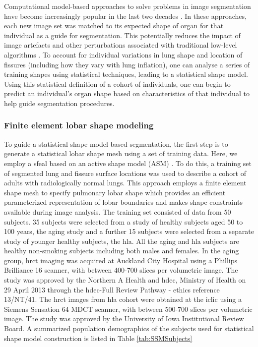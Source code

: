 Computational model-based approaches to solve problems in image segmentation have become increasingly popular in the last two decades \citep{taylor1995medical,kelemen1999elastic,tsai2003shape,okada2008automated}. In these approaches, each new image set was matched to its expected shape of organ for that individual as a guide for segmentation. This potentially reduces the impact of image artefacts and other perturbations associated with traditional low-level algorithms \citep{ecabert2008automatic,zhang2013development}. To account for individual variations in lung shape and location of fissures (including how they vary with lung inflation), one can analyse a series of training shapes using statistical techniques, leading to a statistical shape model. Using this statistical definition of a cohort of individuals, one can begin to predict an individual's organ shape based on characteristics of that individual to help guide segmentation procedures.

\subsubsection{Finite element lobar shape modeling} 

To guide a statistical shape model based segmentation, the first step is to generate a statistical lobar shape mesh using a set of training data. Here, we employ a \gls{sfeal} based on an active shape model (ASM) \citep{cootes1995active}. To do this, a training set of segmented lung and fissure surface locations was used to describe a cohort of adults with radiologically normal lungs. This approach employs a finite element shape mesh to specify pulmonary lobar shape which provides an efficient parameterized representation of lobar boundaries and makes shape constraints available during image analysis. The training set consisted of data from 50 subjects. 35 subjects were selected from a study of healthy subjects aged 50 to 100 years, the \gls{aging} study and a further 15 subjects were selected from a separate study of younger healthy subjects, the \gls{hla}. All the \gls{aging} and \gls{hla} subjects are healthy non-smoking subjects including both males and females. In the \gls{aging} group, \gls{hrct} imaging was acquired at Auckland City Hospital using a Phillips Brilliance 16 scanner, with between 400-700 slices per volumetric image. The study was approved by the Northern A Health and \gls{hdec}, Ministry of Health on 29 April 2013 through the \gls{hdec}-Full Review Pathway - ethics reference 13/NT/41. The \gls{hrct} images from \gls{hla} cohort were obtained at the \gls{iclic} using a Siemens Sensation 64 MDCT scanner, with between 500-700 slices per volumetric image. The study was approved by the University of Iowa Institutional Review Board. A summarized population demographics of the subjects used for statistical shape model construction is listed in Table \ref{tab:SSMSubjects}

